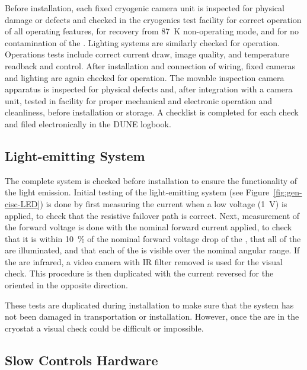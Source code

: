 Before installation, each fixed cryogenic camera unit is inspected for physical damage or defects and checked in the cryogenics test facility  for correct operation of all operating features, for recovery from \SI{87}{K} non-operating mode, and for no contamination of the \lar{}. Lighting systems are similarly checked for operation. Operations tests include correct current draw, image quality, and temperature readback and control. After installation and connection of wiring, fixed cameras and lighting are again  checked for operation. The movable inspection camera apparatus is inspected for physical defects and, after integration with a camera unit, tested in facility for proper mechanical and electronic operation and cleanliness, before installation or storage. A checklist is completed for each  check and filed electronically in the DUNE logbook. 

\subsection{Light-emitting System}
\label{sec:fdgen-slow-cryo-qc-les}

The complete system is checked before installation to ensure the functionality of the light emission. 
Initial testing of the light-emitting system (see Figure~\ref{fig:gen-cisc-LED}) is done by first
measuring the current when a low voltage (\SI{1}{V}) is applied, to check
that the resistive  failover path is correct. Next, measurement
of the forward voltage is done with the nominal forward current applied, to
check that it is within \SI{10}{\%} of the nominal forward voltage drop of
the , that all of the  are illuminated, and that each of the
 is visible over the nominal angular range. If the  are
infrared, a video camera with IR filter removed is used for the
visual check. This procedure is then duplicated with the current
reversed for the  oriented in the opposite direction.  

These tests are duplicated during
installation to make sure that the system has
not been damaged in transportation or installation. However, once
the  are in the cryostat a visual check could be difficult or impossible.


\subsection{Slow Controls Hardware}
\label{sec:fdgen-slow-cryo-qc-sc-hard}

